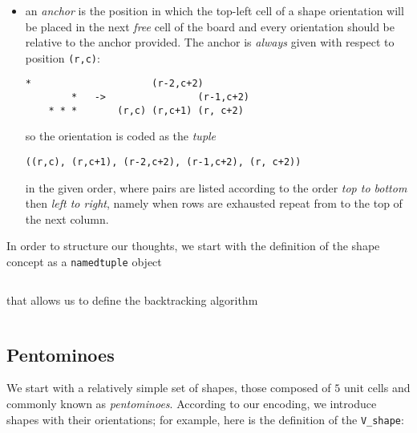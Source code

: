 \begin{itemize}
    \item an \textit{anchor} is the position in which the top-left cell of
    a shape orientation will be placed in the next \textit{free} cell of the
    board and every orientation should be relative to the anchor provided.
    The anchor is \textit{always} given with respect to position \verb|(r,c)|:
    \begin{Verbatim}[baselinestretch=0.8]
        *                     (r-2,c+2)
        *   ->                (r-1,c+2)
    * * *       (r,c) (r,c+1) (r, c+2)
    \end{Verbatim}
    so the orientation is coded as the \textit{tuple}
    \begin{Verbatim}[baselinestretch=0.8]
    ((r,c), (r,c+1), (r-2,c+2), (r-1,c+2), (r, c+2))
    \end{Verbatim}
    in the given order, where pairs are listed according to the order
    \textit{top to bottom} then \textit{left to right}, namely when rows are
    exhausted repeat from to the top of the next column.

\end{itemize}

In order to structure our thoughts, we start with the definition of the shape
concept as a \verb|namedtuple| object
\inputminted[baselinestretch=0.8,stripnl=false,firstline=4, lastline=6]{python}{backtracking/polyominoes.py}
\noindent that allows us to define the backtracking algorithm
\inputminted[baselinestretch=0.8,stripnl=false,firstline=8, lastline=60]
    {python}{backtracking/polyominoes.py}

\subsection{Pentominoes}

We start with a relatively simple set of shapes, those composed of $5$ unit
cells and commonly known as \textit{pentominoes}.  According to our encoding,
we introduce shapes with their orientations; for example, here is the
definition of the \verb|V_shape|:
\inputminted[baselinestretch=0.8,stripnl=false,firstline=193, lastline=205]
    {python}{backtracking/polyominoes.py}

